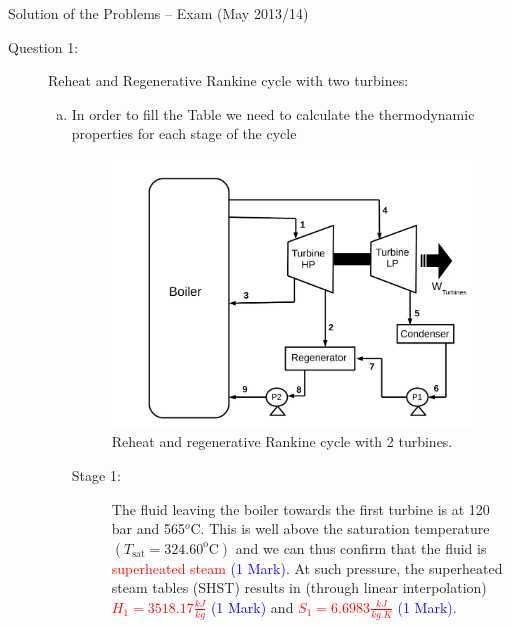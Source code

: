 \documentclass[12pt,twoside]{report}
\newcommand{\frc}{\displaystyle\frac}
\begin{document}
\setcounter{page}{1}

\vfill

\pagebreak


\begin{center}
{\Large Solution of the Problems -- Exam (May 2013/14)}
\end{center}

\begin{description}

\item [Question 1:] Reheat and Regenerative Rankine cycle with two turbines:
\begin{enumerate}[(a)]

\item \label{Q1}In order to fill the Table we need to calculate the thermodynamic properties for each stage of the cycle 

\begin{figure}[h]
\begin{center}
\includegraphics[width=10.cm,clip]{./Pics/Exam_Reheat_Regenerative_Rankine_Cycle}
\vspace{-.5cm}
\caption{ Reheat and regenerative Rankine cycle with 2 turbines.}
\label{exam_mod02_rankinecycle}
\end{center}
\end{figure}

\begin{description}

\item [Stage 1:] The fluid leaving the boiler towards the first turbine is at 120 bar and 565$^{o}$C. This is well above the saturation temperature $\left(T_{\text{sat}}=324.60^{\text{o}}\text{C}\right)$ and we can thus confirm that the fluid is \textcolor{red}{superheated steam} \textcolor{blue}{(1 Mark)}. At such pressure, the superheated steam tables (SHST) results in (through linear interpolation) \textcolor{red}{$H_{1}=3518.17\frc{kJ}{kg}$} \textcolor{blue}{(1 Mark)} and \textcolor{red}{$S_{1}=6.6983\frc{kJ}{kg.K}$} \textcolor{blue}{(1 Mark)}.


\end{description}
\end{enumerate}
\end{description}
\end{document}
